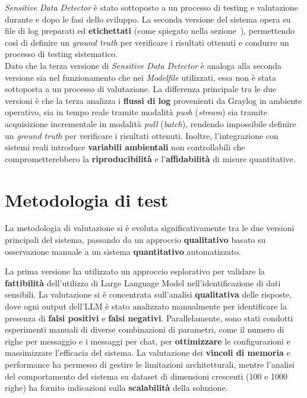 \documentclass[12pt,twoside]{report}
\begin{document}
\textit{Sensitive Data Detector} è stato sottoposto a un processo di testing e valutazione durante e dopo le fasi dello sviluppo. La seconda versione del sistema opera su file di log preparati ed \textbf{etichettati} (come spiegato nella sezione~), permettendo così di definire un \textit{ground truth} per verificare i risultati ottenuti e condurre un processo di testing sistematico.\\
Dato che la terza versione di \textit{Sensitive Data Detector} è analoga alla seconda versione sia nel funzionamento che nei \textit{Modelfile} utilizzati, essa non è stata sottoposta a un processo di valutazione. La differenza principale tra le due versioni è che la terza analizza i \textbf{flussi di log} provenienti da Graylog in ambiente operativo, sia in tempo reale tramite modalità \textit{push} (\textit{stream}) sia tramite acquisizione incrementale in modalità \textit{pull} (\textit{batch}), rendendo impossibile definire un \textit{ground truth} per verificare i risultati ottenuti. Inoltre, l'integrazione con sistemi reali introduce \textbf{variabili ambientali} non controllabili che comprometterebbero la \textbf{riproducibilità} e l'\textbf{affidabilità} di misure quantitative.

\section{Metodologia di test}
\label{sec:metodologia_test}

La metodologia di valutazione si è evoluta significativamente tra le due versioni principali del sistema, passando da un approccio \textbf{qualitativo} basato su osservazione manuale a un sistema \textbf{quantitativo} automatizzato.

La prima versione ha utilizzato un approccio esplorativo per validare la \textbf{fattibilità} dell'utilizzo di Large Language Model nell'identificazione di dati sensibili. La valutazione si è concentrata sull'analisi \textbf{qualitativa} delle risposte, dove ogni output dell'LLM è stato analizzato manualmente per identificare la presenza di \textbf{falsi positivi} e \textbf{falsi negativi}. Parallelamente, sono stati condotti esperimenti manuali di diverse combinazioni di parametri, come il numero di righe per messaggio e i messaggi per chat, per \textbf{ottimizzare} le configurazioni e massimizzare l'efficacia del sistema. La valutazione dei \textbf{vincoli di memoria} e performance ha permesso di gestire le limitazioni architetturali, mentre l'analisi del comportamento del sistema su dataset di dimensioni crescenti (100 e 1000 righe) ha fornito indicazioni sulla \textbf{scalabilità} della soluzione.
\end{document}
